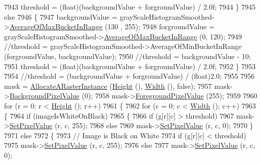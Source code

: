 \begin{DoxyCode}
7943       threshold = (float)(backgroundValue + forgroundValue) / 2.0f;
7944     \}
7945     \textcolor{keywordflow}{else}
7946     \{
7947       backgroundValue = grayScaleHistogramSmoothed->\hyperlink{class_k_k_b_1_1_histogram_ac0d1890f4e8826a2f7a217ecfbf76c59}{AverageOfMaxBucketInRange} (130
      , 255);
7948       forgroundValue  = grayScaleHistogramSmoothed->\hyperlink{class_k_k_b_1_1_histogram_ac0d1890f4e8826a2f7a217ecfbf76c59}{AverageOfMaxBucketInRange} (0, 
      120);
7949       \textcolor{comment}{//threshold = grayScaleHistogramSmoothed->AverageOfMinBucketInRange (forgroundValue,
       backgroundValue);}
7950       \textcolor{comment}{//threshold = backgroundValue - 10; }
7951       threshold = (float)(backgroundValue + forgroundValue) / 2.0f;
7952     \}
7953 
7954     \textcolor{comment}{//threshold = (backgroundValue + forgroundValue) / (float)2.0;}
7955 
7956     mask = \hyperlink{class_k_k_b_1_1_raster_aa879980d112c01cb7ad9a3cfc7cd6f64}{AllocateARasterInstance} (\hyperlink{class_k_k_b_1_1_raster_af8d10d15697d5b92fb9595c48b529feb}{Height} (), 
      \hyperlink{class_k_k_b_1_1_raster_aa2780c0b7ae75b7b595f99329689c1f6}{Width} (), \textcolor{keyword}{false});
7957     mask->\hyperlink{class_k_k_b_1_1_raster_a823cb64d8d4c82620d16564e13855e75}{BackgroundPixelValue} (0);
7958     mask->\hyperlink{class_k_k_b_1_1_raster_a11b142b955f79a1482606a32ce209373}{ForegroundPixelValue} (255);
7959 
7960     \textcolor{keywordflow}{for}  (r = 0;  r < \hyperlink{class_k_k_b_1_1_raster_af8d10d15697d5b92fb9595c48b529feb}{Height} ();  r++)
7961     \{
7962       \textcolor{keywordflow}{for}  (c = 0;  c < \hyperlink{class_k_k_b_1_1_raster_aa2780c0b7ae75b7b595f99329689c1f6}{Width} ();  c++)
7963       \{
7964         \textcolor{keywordflow}{if}  (imageIsWhiteOnBlack)
7965         \{
7966           \textcolor{keywordflow}{if}  (g[r][c] > threshold)
7967             mask->\hyperlink{class_k_k_b_1_1_raster_a5ddb8bd069dc64241941b0b011af8667}{SetPixelValue} (r, c, 255);
7968           \textcolor{keywordflow}{else}
7969             mask->\hyperlink{class_k_k_b_1_1_raster_a5ddb8bd069dc64241941b0b011af8667}{SetPixelValue} (r, c, 0);
7970         \}
7971         \textcolor{keywordflow}{else}
7972         \{
7973           \textcolor{comment}{// Image is Black on White}
7974           \textcolor{keywordflow}{if}  (g[r][c] < threshold)
7975             mask->\hyperlink{class_k_k_b_1_1_raster_a5ddb8bd069dc64241941b0b011af8667}{SetPixelValue} (r, c, 255);
7976           \textcolor{keywordflow}{else}
7977             mask->\hyperlink{class_k_k_b_1_1_raster_a5ddb8bd069dc64241941b0b011af8667}{SetPixelValue} (r, c, 0);

\end{DoxyCode}
